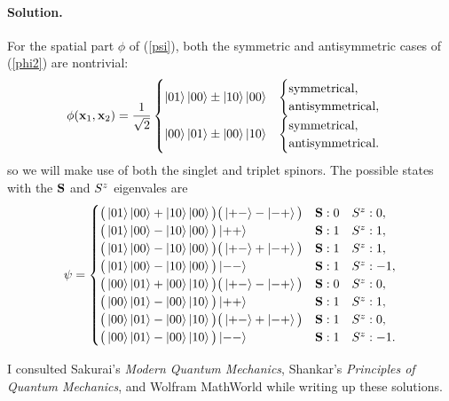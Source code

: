 \documentclass[11pt]{article}
\newcommand{\refeq}[1]{(\ref{#1})}
\newcommand{\beq}{\begin{equation*}}
\newcommand{\eeq}{\end{equation*}}
\newenvironment{solution}
{
    \paragraph{Solution.}
    \ignorespaces
}
{
}
\begin{document}
\begin{solution}
	For the spatial part $\phi$ of \refeq{psi}, both the symmetric and antisymmetric cases of \refeq{phi2} are nontrivial:
	\beq
		\phi(\vxq, \vxw) = \frac{1}{\sqrt{2}} \begin{cases}
			\ket{0 1} \ket{0 0} \pm \ket{1 0} \ket{0 0} & \begin{cases} \text{symmetrical}, \\ \text{antisymmetrical}, \end{cases} \\
			\ket{0 0} \ket{0 1} \pm \ket{0 0} \ket{1 0} & \begin{cases} \text{symmetrical}, \\ \text{antisymmetrical}. \end{cases}
		\end{cases}
	\eeq
	so we will make use of both the singlet and triplet spinors.  The possible states with the $\vb{S}$ and $S^z$ eigenvales are
	\beq
		\psi = \begin{cases}
			\big( \ket{0 1} \ket{0 0} + \ket{1 0} \ket{0 0} \big) \big( \ket{+ -} - \ket{- +} \big) & \vS : 0 \quad \Sz : 0, \\
			\big( \ket{0 1} \ket{0 0} - \ket{1 0} \ket{0 0} \big) \ket{+ +} & \vS : 1 \quad \Sz : 1, \\
			\big( \ket{0 1} \ket{0 0} - \ket{1 0} \ket{0 0} \big) \big( \ket{+ -} + \ket{- +} \big) & \vS : 1 \quad \Sz : 1, \\
			\big( \ket{0 1} \ket{0 0} - \ket{1 0} \ket{0 0} \big) \ket{- -} & \vS : 1 \quad \Sz : -1, \\
			\big( \ket{0 0} \ket{0 1} + \ket{0 0} \ket{1 0} \big) \big( \ket{+ -} - \ket{- +} \big) & \vS : 0 \quad \Sz : 0, \\
			\big( \ket{0 0} \ket{0 1} - \ket{0 0} \ket{1 0} \big) \ket{+ +} & \vS : 1 \quad \Sz : 1, \\
			\big( \ket{0 0} \ket{0 1} - \ket{0 0} \ket{1 0} \big) \big( \ket{+ -} + \ket{- +} \big) & \vS : 1 \quad \Sz : 0, \\
			\big( \ket{0 0} \ket{0 1} - \ket{0 0} \ket{1 0} \big) \ket{- -} & \vS : 1 \quad \Sz : -1.
		\end{cases}
	\eeq
\end{solution}



\vfill
I consulted Sakurai's \emph{Modern Quantum Mechanics}, Shankar's \emph{Principles of Quantum Mechanics}, and Wolfram MathWorld while writing up these solutions.
\end{document}
